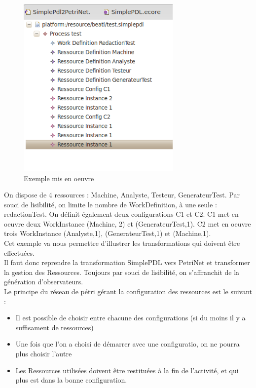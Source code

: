 \begin{figure}[!h] 
\begin{center}
\includegraphics[width=8cm]{Capture-15.png}
\caption{Exemple mis en oeuvre} 
\label{img1} 
\end{center}
\end{figure}

On dispose de 4 ressources : Machine, Analyste, Testeur, GenerateurTest.
Par souci de lisibilité, on limite le nombre de WorkDefinition, à une seule : redactionTest. On définit également deux configurations C1 et C2. C1 met en oeuvre deux WorkInstance (Machine, 2) et (GenerateurTest,1). C2 met en oeuvre trois WorkInstance (Analyste,1), (GenerateurTest,1) et (Machine,1).\\

Cet exemple va nous permettre d'illustrer les transformations qui doivent être effectuées.\\

Il faut donc reprendre la transformation SimplePDL vers PetriNet et transformer la gestion des Ressources. Toujours par souci de lisibilité, on s'affranchit de la génération d'observateurs.\\

Le principe du réseau de pétri gérant la configuration des ressources est le suivant :\\

\begin{itemize}
\item Il est possible de choisir entre chacune des configurations (si du moins il y a suffisament de ressources)
\item Une fois que l'on a choisi de démarrer avec une configuratio, on ne pourra plus choisir l'autre
\item Les Ressources utilisées doivent être restituées à la fin de l'activité, et qui plus est dans la bonne configuration.
\end{itemize}

